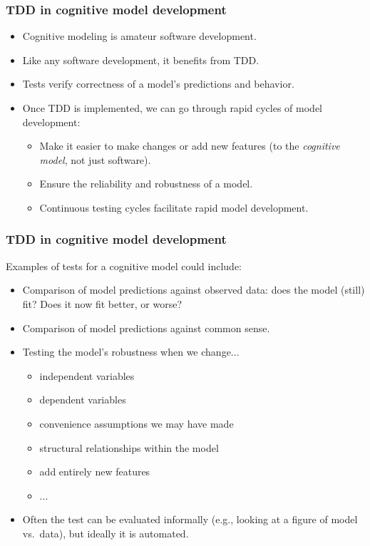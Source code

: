 \begin{frame}
\frametitle{TDD in cognitive model development}
\begin{itemize}
\item Cognitive modeling is amateur software development.
\item Like any software development, it benefits from TDD.
\item Tests verify correctness of a model's predictions and behavior.
\item Once TDD is implemented, we can go through rapid cycles of model development:
\begin{itemize}
\item Make it easier to make changes or add new features (to the \emph{cognitive model}, not just software).
\item Ensure the reliability and robustness of a model.
\item Continuous testing cycles facilitate rapid model development.
\end{itemize}
\end{itemize}
\end{frame}

\begin{frame}
\frametitle{TDD in cognitive model development}
Examples of tests for a cognitive model could include: 
     \begin{itemize}
     \item Comparison of model predictions against observed data: does the model (still) fit?  Does it now fit better, or worse?
     \item Comparison of model predictions against common sense.
     \item Testing the model's robustness when we change...
     \begin{itemize}
     \item independent variables
     \item dependent variables
     \item convenience assumptions we may have made
     \item structural relationships within the model
     \item add entirely new features
     \item ...
     \end{itemize}
     \item Often the test can be evaluated informally (e.g., looking at a figure of model vs.\ data), but ideally it is automated.
  \end{itemize}

\end{frame}


